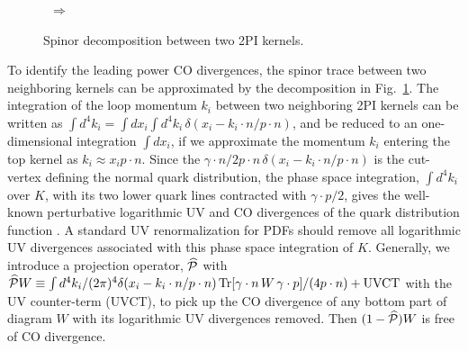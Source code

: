 \documentclass[twocolumn,aps,prl,superscriptaddress,nofootinbib,showpacs]{revtex4-1}
\begin{document}
\begin{figure}[h]
\begin{minipage}[c]{0.8in}
\end{minipage}
\ $\Rightarrow$ \
\begin{minipage}[c]{0.7in}
\end{minipage}
\begin{minipage}[c]{1.2in}
\break
{}
\end{minipage}
\caption{\label{fig:spin-2pi}
Spinor decomposition between two 2PI kernels.}
\end{figure}

To identify the leading power CO divergences, the spinor trace between two neighboring kernels can be approximated by the decomposition in Fig.~\ref{fig:spin-2pi}. The integration of the loop momentum $k_i$ between two neighboring 2PI kernels can be written as $\int d^4k_i = \int dx_i\int d^4k_i\, \delta(x_i-k_i\cdot n/p\cdot n)$, and be reduced to an one-dimensional integration $\int dx_i$, if we approximate the momentum $k_i$ entering the top kernel as $k_i\approx x_ip\cdot n$.  Since the $\gamma\cdot n/2p\cdot n\,\delta(x_i-k_i\cdot n/p\cdot n)$ is the cut-vertex defining the normal quark distribution, the phase space integration, $\int d^4k_i$ over $K$, with its two lower quark lines contracted with $\gamma\cdot p/2$, gives the well-known perturbative logarithmic UV and CO divergences of the quark distribution function \cite{Collins:1981uw}.  A standard UV renormalization for PDFs should remove all logarithmic UV divergences associated with this phase space integration of $K$.
Generally, we introduce a projection operator, $\widehat{\cal P}$ with $\widehat{\cal P}{W} \equiv \int d^4k_i/(2\pi)^4\delta(x_i-k_i\cdot n/p\cdot n)\, \text{Tr}[\gamma\cdot n\, W\, \gamma\cdot p]/(4p\cdot n)  + \text{UVCT}$ with the UV counter-term (UVCT), to pick up the CO divergence of any bottom part of diagram ${W}$ with its logarithmic UV divergences removed. Then $(1-\widehat{\cal P}){W}$ is free of CO divergence.
\end{document}
